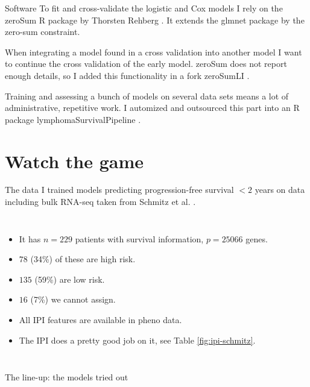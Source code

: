 \documentclass[10pt, aspectratio=169]{beamer}
\begin{document}
\begin{frame}{Software}
  To fit and cross-validate the logistic and Cox models I rely on the \alert{zeroSum R package} 
  by Thorsten Rehberg \autocite{zerosumR}. It extends the glmnet package by the zero-sum constraint.

  When integrating a model found in a cross validation into another model I want to continue the cross 
  validation of the early model. zeroSum does not report enough details, so I added this functionality in 
  a \alert{fork zeroSumLI} \autocite{zerosumliR}.

  Training and assessing a bunch of models on several data sets means a lot of administrative, repetitive 
  work. I automized and outsourced this part into an \alert{R package lymphomaSurvivalPipeline} \autocite{lspR}.
\end{frame}

\section{Watch the game}

\begin{frame}{The data}
  I trained models predicting progression-free survival $< 2$ years on data including bulk RNA-seq 
  taken from Schmitz et al. \autocite{schmitz18}. 
  \begin{columns}
      \begin{itemize}
        \item It has $n = \num{229}$ patients with survival information, $p = \num{25066}$ genes.
        \item $\num{78}$ (34\%) of these are high risk.
        \item $\num{135}$ (59\%) are low risk. 
        \item $\num{16}$ (7\%) we cannot assign.
        \item All IPI features are available in pheno data.
        \item The IPI does a pretty good job on it, see Table \ref{fig:ipi-schmitz}.
      \end{itemize}
      
    \end{columns}
\end{frame}

\begin{frame}{The line-up: the models tried out}
  
\end{frame}
\end{document}
